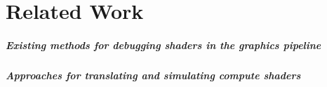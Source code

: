 
\chapter{Related Work}\label{cha:RelatedWork}
\paragraph{Existing methods for debugging shaders in the graphics pipeline}

\paragraph{Approaches for translating and simulating compute shaders}